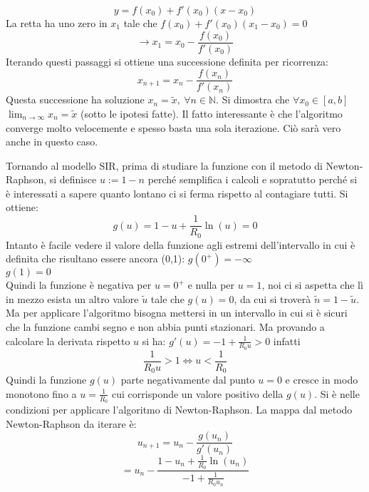 \documentclass[Main.tex]{subfiles}
\begin{document}
\begin{appendic}
\begin{equation}
  y=f(x_0) + f'(x_0)(x-x_0)
\end{equation}
La retta ha uno zero in $x_1$ tale che $f(x_0) + f'(x_0)(x_1-x_0)=0$
\begin{equation}
  \rightarrow x_1=x_0 - \frac{f(x_0)}{f'(x_0)}
\end{equation}
Iterando questi passaggi si ottiene una successione definita per ricorrenza:
\begin{equation}
  x_{n+1}= x_n - \frac{f(x_n)}{f'(x_n)}
\end{equation}
Questa successione ha soluzione $x_n = \tilde x, \ \forall n \in \mathbb{N}$. Si dimostra che $\forall x_0 \in [a,b]$ $\lim_{n\rightarrow \infty} x_n = \tilde x$ (sotto le ipotesi fatte). Il fatto interessante è che l'algoritmo converge molto velocemente e spesso basta una sola iterazione. Ciò sarà vero anche in questo caso.


Tornando al modello SIR, prima di studiare la funzione con il metodo di Newton-Raphson, si definisce $u := 1-n$ perché semplifica i calcoli e sopratutto perché si è interessati a sapere quanto lontano ci si ferma rispetto al contagiare tutti. Si ottiene:
\begin{equation}
  g(u) = 1-u + \frac{1}{R_0} \ln(u)=0
\end{equation}
Intanto è facile vedere il valore della funzione agli estremi dell'intervallo in cui è definita che risultano essere ancora (0,1): \newline
$g(0^+)= - \infty$\\
$g(1)=0$\\
Quindi la funzione è negativa per $u=0^+$ e nulla per $u=1$, noi ci si aspetta che lì in mezzo esista un altro valore $\tilde u$ tale che $g(u)=0$, da cui si troverà $\tilde n =1-\tilde u$. Ma per applicare l'algoritmo bisogna mettersi in un intervallo in cui si è sicuri che la funzione cambi segno e non abbia punti stazionari. Ma provando a calcolare la derivata rispetto $u$ si ha:
$g'(u)=-1+ \frac{1}{R_0 u}>0$
infatti
\begin{equation}
  \frac{1}{R_0 u} > 1 \iff u < \frac{1}{R_0}
\end{equation}
Quindi la funzione $g(u)$ parte negativamente dal punto $u=0$ e cresce in modo monotono fino a $u=\frac{1}{R_0}$ cui corrisponde un valore positivo della $g(u)$. Si è nelle condizioni per applicare l'algoritmo di Newton-Raphson. La mappa dal metodo Newton-Raphson da iterare è:
\begin{equation}
  u_{n+1}= u_n - \frac{g(u_n)}{g'(u_n)}
\end{equation}
\begin{equation}
  = u_n - \frac{1- u_n + \frac{1}{R_0} \ln(u_n)}{-1 + \frac{1}{R_0 u_n}}
\end{equation}


\end{appendic}
\end{document}
